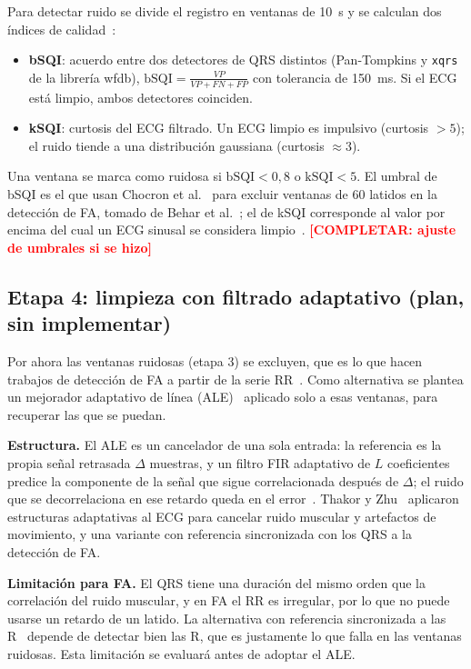 \documentclass[11pt,a4paper]{article}
\newcommand{\completar}[1]{\textcolor{red}{\textbf{[COMPLETAR: #1]}}}
\begin{document}
Para detectar ruido se divide el registro en ventanas de 10~s y se calculan dos índices de calidad~\cite{li2008,clifford2012}:
\begin{itemize}
  \item \textbf{bSQI}: acuerdo entre dos detectores de QRS distintos (Pan-Tompkins y \texttt{xqrs} de la librería wfdb), $\text{bSQI} = \frac{VP}{VP+FN+FP}$ con tolerancia de 150~ms. Si el ECG está limpio, ambos detectores coinciden.
  \item \textbf{kSQI}: curtosis del ECG filtrado. Un ECG limpio es impulsivo (curtosis $>5$); el ruido tiende a una distribución gaussiana (curtosis $\approx 3$).
\end{itemize}
Una ventana se marca como ruidosa si $\text{bSQI} < 0{,}8$ o $\text{kSQI} < 5$. El umbral de bSQI es el que usan Chocron et al.~\cite{chocron2020} para excluir ventanas de 60 latidos en la detección de FA, tomado de Behar et al.~\cite{behar2013}; el de kSQI corresponde al valor por encima del cual un ECG sinusal se considera limpio~\cite{zhao2018}. \completar{ajuste de umbrales si se hizo}

\subsection{Etapa 4: limpieza con filtrado adaptativo (plan, sin implementar)}
Por ahora las ventanas ruidosas (etapa 3) se excluyen, que es lo que hacen trabajos de detección de FA a partir de la serie RR~\cite{chocron2020}. Como alternativa se plantea un mejorador adaptativo de línea (ALE)~\cite{widrow1975,thakor1991} aplicado solo a esas ventanas, para recuperar las que se puedan.

\textbf{Estructura.} El ALE es un cancelador de una sola entrada: la referencia es la propia señal retrasada $\Delta$ muestras, y un filtro FIR adaptativo de $L$ coeficientes predice la componente de la señal que sigue correlacionada después de $\Delta$; el ruido que se decorrelaciona en ese retardo queda en el error~\cite{widrow1975}. Thakor y Zhu~\cite{thakor1991} aplicaron estructuras adaptativas al ECG para cancelar ruido muscular y artefactos de movimiento, y una variante con referencia sincronizada con los QRS a la detección de FA.

\textbf{Limitación para FA.} El QRS tiene una duración del mismo orden que la correlación del ruido muscular, y en FA el RR es irregular, por lo que no puede usarse un retardo de un latido. La alternativa con referencia sincronizada a las R~\cite{thakor1991,fotiadou2018} depende de detectar bien las R, que es justamente lo que falla en las ventanas ruidosas. Esta limitación se evaluará antes de adoptar el ALE.
\end{document}
